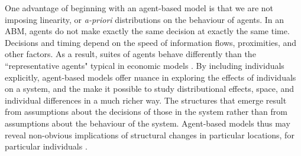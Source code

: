 One advantage of beginning with an agent-based model is that we are not imposing linearity, or \textit{a-priori} distributions on the behaviour of agents. In an ABM, agents do not make exactly the same decision at exactly the same time. Decisions and timing depend on the speed of information flows, proximities, and other factors. As a result, suites of agents behave differently than the ``representative agents" typical in economic models \cite{darley_towards_1999, tesfatsion_agent-based_2002}. 
By including individuals explicitly, agent-based models offer nuance in exploring the effects of individuals on a system, and the make it possible to study distributional effects, space, and individual differences in a much richer way. The structures that emerge result from assumptions about the decisions of those in the system rather than from assumptions about the behaviour of the system. Agent-based models thus may reveal non-obvious implications of structural changes in particular locations, for particular individuals \cite{darley_towards_1999, happe_agricultural_2004}. 


